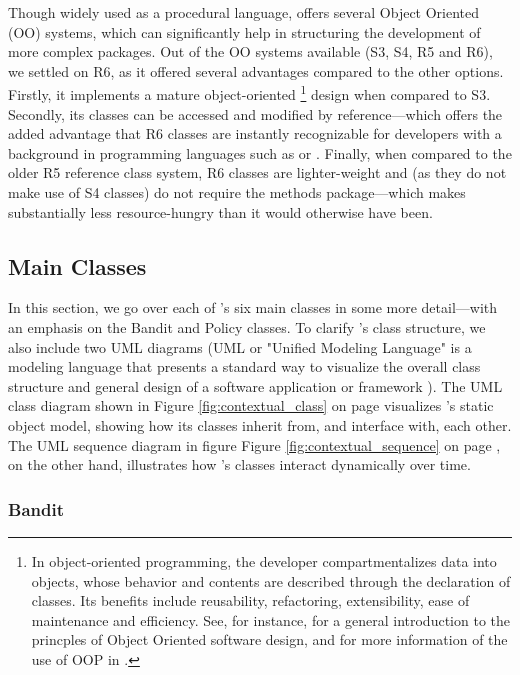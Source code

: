 \documentclass{jss}\usepackage[]{graphicx}\usepackage[]{color}
\begin{document}
Though widely used as a procedural language,  offers several Object Oriented (OO) systems, which can significantly help in structuring the development of more complex packages. Out of the OO systems available (S3, S4, R5 and R6), we settled on R6, as it offered several advantages compared to the other options. Firstly, it implements a mature object-oriented \footnote{In object-oriented programming, the developer compartmentalizes data into objects, whose behavior and contents are described through the declaration of classes. Its benefits include reusability, refactoring, extensibility, ease of maintenance and efficiency. See, for instance, \cite{Wirfs-Brock1990} for a general introduction to the princples of Object Oriented software design, and \cite{wickham2014advanced} for more information of the use of OOP in .} design when compared to S3. Secondly, its classes can be accessed and modified by reference---which offers the added advantage that R6 classes are instantly recognizable for developers with a background in programming languages such as  or . Finally, when compared to the older R5 reference class system, R6 classes are lighter-weight and (as they do not make use of S4 classes) do not require the methods package---which makes  substantially less resource-hungry than it would otherwise have been.

\subsection{Main Classes}

In this section, we go over each of 's six main classes in some more detail---with an emphasis on the Bandit and Policy classes. To clarify 's class structure, we also include two UML diagrams (UML or "Unified Modeling Language" is a modeling language that presents a standard way to visualize the overall class structure and general design of a software application or framework \citep{Rumbaugh2004}). The UML class diagram shown in Figure \ref{fig:contextual_class} on page \pageref{fig:contextual_class} visualizes 's static object model, showing how its classes inherit from, and interface with, each other. The UML sequence diagram in figure Figure \ref{fig:contextual_sequence} on page \pageref{fig:contextual_sequence}, on the other hand, illustrates how 's classes interact dynamically over time.

\subsubsection{Bandit}
\end{document}
